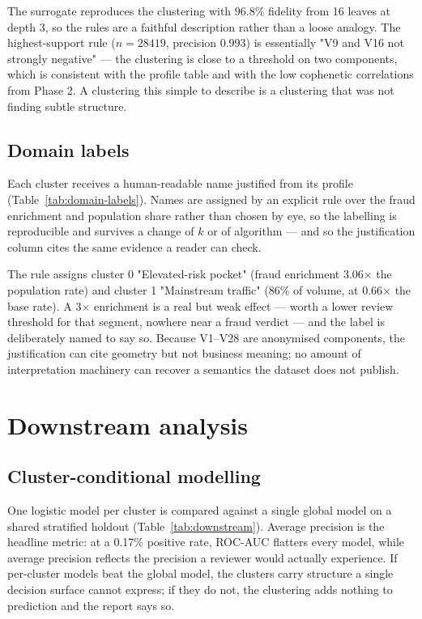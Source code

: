 \documentclass[11pt, a4paper]{article}
\providecommand{\num}[1]{#1}
\begin{document}



The surrogate reproduces the clustering with \num{96.8}\% fidelity from \num{16}
leaves at depth 3, so the rules are a faithful description rather than a loose
analogy. The highest-support rule ($n = \num{28419}$, precision \num{0.993}) is
essentially "V9 and V16 not strongly negative" --- the clustering is close to a
threshold on two components, which is consistent with the profile table and with
the low cophenetic correlations from Phase 2. A clustering this simple to
describe is a clustering that was not finding subtle structure.

\subsection{Domain labels}
Each cluster receives a human-readable name justified from its profile
(Table~\ref{tab:domain-labels}). Names are assigned by an explicit rule over the
fraud enrichment and population share rather than chosen by eye, so the labelling
is reproducible and survives a change of $k$ or of algorithm --- and so the
justification column cites the same evidence a reader can check.



The rule assigns cluster 0 "Elevated-risk pocket" (fraud enrichment
\num{3.06}$\times$ the population rate) and cluster 1 "Mainstream traffic"
(\num{86}\% of volume, at \num{0.66}$\times$ the base rate). A
\num{3}$\times$ enrichment is a real but weak effect --- worth a lower review
threshold for that segment, nowhere near a fraud verdict --- and the label is
deliberately named to say so. Because V1--V28 are anonymised components, the
justification can cite geometry but not business meaning; no amount of
interpretation machinery can recover a semantics the dataset does not publish.

\section{Downstream analysis}

\subsection{Cluster-conditional modelling}
One logistic model per cluster is compared against a single global model on a
shared stratified holdout (Table~\ref{tab:downstream}). Average precision is the
headline metric: at a \num{0.17}\% positive rate, ROC-AUC flatters every model,
while average precision reflects the precision a reviewer would actually
experience. If per-cluster models beat the global model, the clusters carry
structure a single decision surface cannot express; if they do not, the
clustering adds nothing to prediction and the report says so.
\end{document}
